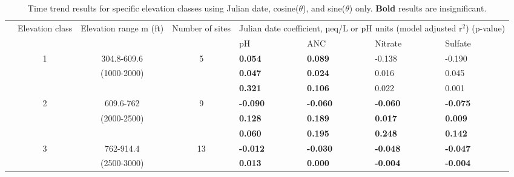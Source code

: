 \begin{table}[p]\scriptsize
\caption{Time trend results for specific elevation classes using Julian date, cosine($\theta$), and sine($\theta$) only. \textbf{Bold} results are insignificant.}
\begin{tabular}{ccccllll}
\hline\noalign{\smallskip}
\multicolumn{1}{p{.5cm}}{Time set} & \multicolumn{1}{p{1cm}}{Elevation class} &\multicolumn{1}{p{2cm}}{ Elevation range m (ft)} & \multicolumn{1}{p{1cm}}{Number of sites} & \multicolumn{4}{p{8cm}}{Julian date coefficient, µeq/L or pH units (model adjusted r$^2$) (p-value)}   \\ \cline{5-8}\noalign{\smallskip}
 \multicolumn{1}{c}{} & \multicolumn{1}{c}{} & \multicolumn{1}{c}{} & \multicolumn{1}{c}{} & \multicolumn{ 1}{p{2cm}}{pH} & \multicolumn{1}{p{2cm}}{ANC} & \multicolumn{1}{p{2cm}}{Nitrate} & \multicolumn{1}{p{2cm}}{Sulfate} \\ \hline\noalign{\smallskip}
 \multicolumn{1}{c}{1993-2002} &  \multicolumn{1}{c}{1} &  \multicolumn{1}{p{2cm}}{304.8-609.6} &  \multicolumn{1}{c}{5} & \textbf{0.054} &\textbf{0.089 } & -0.138  & -0.190  \\ 
 \multicolumn{1}{c}{} &  \multicolumn{1}{c}{} &  \multicolumn{1}{p{2cm}}{ (1000-2000)} &  \multicolumn{1}{c}{} & \textbf{0.047}&  \textbf{0.024 } & 0.016  & 0.045  \\ 
 \multicolumn{1}{c}{} &  \multicolumn{1}{c}{} &  \multicolumn{1}{c}{} &  \multicolumn{1}{c}{} &\textbf{0.321}&  \textbf{0.106 } & 0.022  & 0.001   \\ \cline{5-8}\noalign{\smallskip}
 \multicolumn{1}{c}{} &  \multicolumn{1}{c}{2} &  \multicolumn{1}{p{2cm}}{609.6-762} &  \multicolumn{1}{c}{9} &\textbf{-0.090}&  \textbf{-0.060 } & \textbf{-0.060 } & \textbf{-0.075 } \\ 
 \multicolumn{1}{c}{} &  \multicolumn{1}{c}{} &  \multicolumn{1}{p{2cm}}{(2000-2500)} &  \multicolumn{1}{c}{} &\textbf{0.128}&  \textbf{0.189 } & \textbf{0.017 } & \textbf{0.009 }   \\ 
 \multicolumn{1}{c}{} &  \multicolumn{1}{c}{} &  \multicolumn{1}{c}{} &  \multicolumn{1}{c}{} & \textbf{0.060 } &\textbf{0.195}& \textbf{0.248 } & \textbf{0.142 }  \\ \cline{5-8}\noalign{\smallskip}
 \multicolumn{1}{c}{} &  \multicolumn{1}{c}{3} &  \multicolumn{1}{p{2cm}}{762-914.4} &  \multicolumn{1}{c}{13}&\textbf{-0.012} & \textbf{-0.030 } & \textbf{-0.048 } & \textbf{-0.047 }  \\ 
 \multicolumn{1}{c}{} &  \multicolumn{1}{c}{} & \multicolumn{1}{p{2cm}}{(2500-3000)} & \multicolumn{1}{c}{} &\textbf{0.013}&\textbf{0.000 } & \textbf{-0.004 } & \textbf{-0.004 } \\

\end{tabular}
\end{table}
